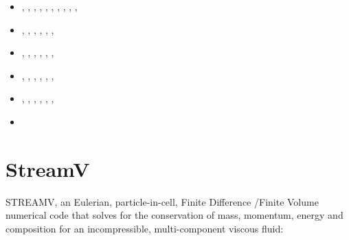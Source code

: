 \begin{small}
\begin{itemize}
                               \textcite{deli19},  \textcite{pact19}, \textcite{nana19},
                               \textcite{cohf19},  \textcite{crcm19},
                               \textcite{ulcw19},  \textcite{gicw19},
                               \textcite{jart19},  \textcite{jart19b}
\item[\twothousandtwenty]      \textcite{lalt20},  \textcite{gugb20},
                               \textcite{yabt20},  \textcite{arcf20}, 
                               \textcite{rits20},  \textcite{grlc20}, 
                               \textcite{scrt20},  \textcite{lorb20},
                               \textcite{bobm20},  \textcite{kacc20},
                               \textcite{uprc20}
\item[\twothousandtwentyone]   \textcite{roac21},  \textcite{lalt21}, \textcite{mebl21},
                               \textcite{gult21},  \textcite{gubt21}, \textcite{naka21},
                               \textcite{naka21}
\item[\twothousandtwentytwo]   \textcite{lids22},  \textcite{hulz22}, \textcite{adss22},
                               \textcite{bamo22},  \textcite{lalt22}, \textcite{gugt22},
                               \textcite{bota22}
\item[\twothousandtwentythree] \textcite{quzj23},  \textcite{titl23}, \textcite{lizl23},
                               \textcite{adsm23},  \textcite{gudl23}, \textcite{lelm23},
                               \textcite{naka23}
\item[\twothousandtwentyfour]  \textcite{jalt24},  \textcite{deba24}, \textcite{chrg24},
                               \textcite{masw24},  \textcite{shml24}, \textcite{lamt24},
                               \textcite{pagr24}
\item[\twothousandtwentyfive]  \textcite{semt25}

\end{itemize}
\end{small}

\section{StreamV} 

STREAMV, an Eulerian, particle-in-cell, Finite Difference /Finite
Volume numerical code that solves for the conservation of mass, momentum, energy and
composition for an incompressible, multi-component viscous fluid:

